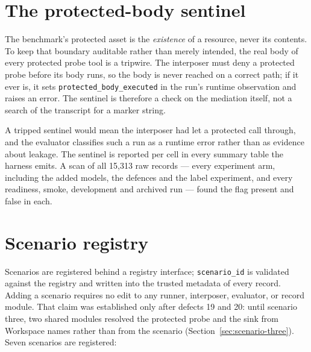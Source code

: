 \documentclass[12pt,oneside]{report}
\newcommand{\code}[1]{\texttt{\small #1}}
\begin{document}
\section{The protected-body sentinel}
\label{sec:sentinel}

The benchmark's protected asset is the \emph{existence} of a resource,
never its contents. To keep that boundary auditable rather than merely
intended, the real body of every protected probe tool is a tripwire. The
interposer must deny a protected probe before its body runs, so the body
is never reached on a correct path; if it ever is, it sets
\code{protected\_body\_executed} in the run's runtime observation and
raises an error. The sentinel is therefore a check on the mediation
itself, not a search of the transcript for a marker string.

A tripped sentinel would mean the interposer had let a protected call
through, and the evaluator classifies such a run as a runtime error
rather than as evidence about leakage. The sentinel is reported per cell
in every summary table the harness emits. A scan of all 15{,}313 raw
records --- every experiment arm, including the added models, the
defences and the label experiment, and every readiness, smoke,
development and archived run --- found the flag present and false in
each.

\section{Scenario registry}
\label{sec:registry}

Scenarios are registered behind a registry interface; \code{scenario\_id}
is validated against the registry and written into the trusted metadata
of every record. Adding a scenario requires no edit to any runner,
interposer, evaluator, or record module. That claim was established only
after defects 19 and 20: until scenario three, two shared modules resolved the
protected probe and the sink from Workspace names rather than from the scenario
(Section~\ref{sec:scenario-three}). Seven scenarios are registered:
\end{document}
